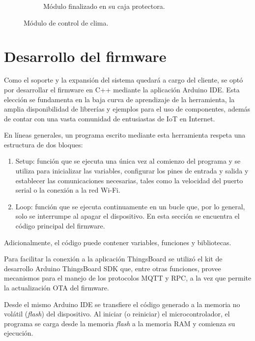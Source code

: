 \begin{figure}[!htpb]
\begin{subfigure}[b]{0.45\textwidth}
		\caption{Módulo finalizado en su caja protectora.}
		\label{fig:vent3}
     \end{subfigure}
     \hfill
        \caption[Módulo de control de clima]{Módulo de control de clima.}
        \label{fig:ventcontrol}
\end{figure}


\pagebreak

\section{Desarrollo del firmware}
\label{sec:Desarrollo del firmware}

Como el soporte y la expansión del sistema quedará a cargo del cliente, se optó por desarrollar el firmware en C++ mediante la aplicación Arduino IDE. Esta elección se fundamenta en la baja curva de aprendizaje de la herramienta, la amplia disponibilidad de librerías y ejemplos para el uso de componentes, además de contar con una vasta comunidad de entusiastas de IoT en Internet.

En líneas generales, un programa escrito mediante esta herramienta respeta una estructura de dos bloques:

\begin{enumerate}

\item Setup: función que se ejecuta una única vez al comienzo del programa y se utiliza para inicializar las variables, configurar los pines de entrada y salida y establecer las comunicaciones necesarias, tales como la velocidad del puerto serial o la conexión a la red Wi-Fi.

\item Loop: función que se ejecuta continuamente en un bucle que, por lo general, solo se interrumpe al apagar el dispositivo. En esta sección se encuentra el código principal del firmware.
\end{enumerate}
Adicionalmente, el código puede contener variables, funciones y bibliotecas.

Para facilitar la conexión a la aplicación ThingsBoard se utilizó el kit de desarrollo Arduino ThingsBoard SDK \citep{tbsdk} que, entre otras funciones, provee mecanismos para el manejo de los protocolos MQTT y RPC, a la vez que permite la actualización OTA \citep{8999425} del firmware.

Desde el mismo Arduino IDE se transfiere el código generado a la memoria no volátil (\textit{flash}) del dispositivo. Al iniciar (o reiniciar) el microcontrolador, el programa se carga desde la memoria \textit{flash} a la memoria RAM y comienza su ejecución.



